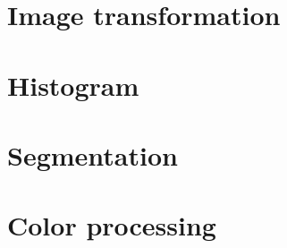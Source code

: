 \section{Image transformation}
\section{Histogram}
\section{Segmentation}
\section{Color processing}

